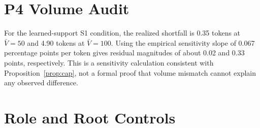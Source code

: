 \documentclass[11pt]{article}
\begin{document}
\section{P4 Volume Audit}
\label{app:p4audit}

\begin{table}[H]
\centering
\small
\setlength{\tabcolsep}{4pt}
\caption{P4 communication-volume audit. Each cell reports mean realized
tokenizer-counted transmission per question followed by the corresponding
realized-to-nominal statistic recorded by the P4 harness.}
\label{tab:p4audit}
\end{table}

For the learned-support S1 condition, the realized shortfall is 0.35 tokens at
$\bar V=50$ and 4.90 tokens at $\bar V=100$. Using the empirical sensitivity
slope of 0.067 percentage points per token gives residual magnitudes of about
0.02 and 0.33 points, respectively. This is a sensitivity calculation
consistent with Proposition~\ref{prop:cap}, not a formal proof that volume
mismatch cannot explain any observed difference.

\section{Role and Root Controls}
\label{app:rolecontrol}
\end{document}
